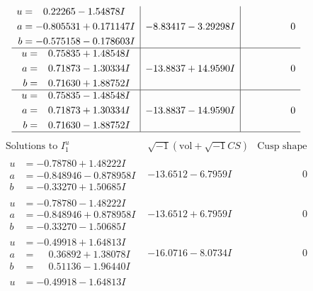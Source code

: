 \documentclass[1p]{elsarticle_modified}
\theoremstyle{definition}
\newcommand{\I}{\sqrt{-1}}
\begin{document}
$$\begin{array}{c|c|c}
\begin{aligned}
u &= \phantom{-}0.22265 - 1.54878 I \\
a &= -0.805531 + 0.171147 I \\
b &= -0.575158 - 0.178603 I\end{aligned}
 & -8.83417 - 3.29298 I & \phantom{-0.000000 } 0 \\ \hline\begin{aligned}
u &= \phantom{-}0.75835 + 1.48548 I \\
a &= \phantom{-}0.71873 - 1.30334 I \\
b &= \phantom{-}0.71630 + 1.88752 I\end{aligned}
 & -13.8837 + 14.9590 I & \phantom{-0.000000 } 0 \\ \hline\begin{aligned}
u &= \phantom{-}0.75835 - 1.48548 I \\
a &= \phantom{-}0.71873 + 1.30334 I \\
b &= \phantom{-}0.71630 - 1.88752 I\end{aligned}
 & -13.8837 - 14.9590 I & \phantom{-0.000000 } 0\\
 \hline 
 \end{array}$$\newpage$$\begin{array}{c|c|c}  
\text{Solutions to }I^u_{1}& \I (\text{vol} + \sqrt{-1}CS) & \text{Cusp shape}\\
 \hline 
\begin{aligned}
u &= -0.78780 + 1.48222 I \\
a &= -0.848946 - 0.878958 I \\
b &= -0.33270 + 1.50685 I\end{aligned}
 & -13.6512 - 6.7959 I & \phantom{-0.000000 } 0 \\ \hline\begin{aligned}
u &= -0.78780 - 1.48222 I \\
a &= -0.848946 + 0.878958 I \\
b &= -0.33270 - 1.50685 I\end{aligned}
 & -13.6512 + 6.7959 I & \phantom{-0.000000 } 0 \\ \hline\begin{aligned}
u &= -0.49918 + 1.64813 I \\
a &= \phantom{-}0.36892 + 1.38078 I \\
b &= \phantom{-}0.51136 - 1.96440 I\end{aligned}
 & -16.0716 - 8.0734 I & \phantom{-0.000000 } 0 \\ \hline\begin{aligned}
u &= -0.49918 - 1.64813 I \\

\end{aligned}
\end{array}$$
\end{document}
